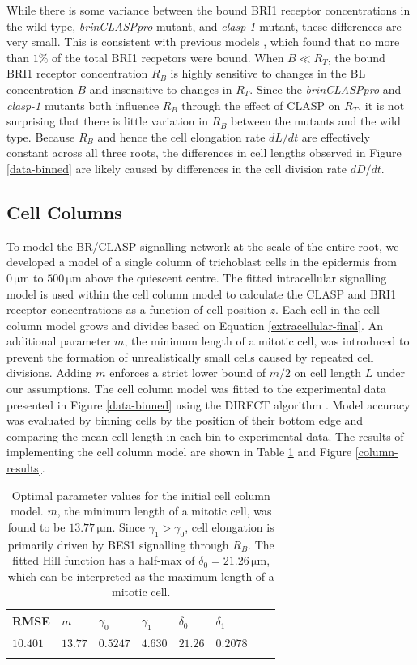\documentclass[referee,pdflatex,sn-mathphys-num]{sn-jnl}
\newcommand{\um}{\,\unit{\micro\metre}}
\begin{document}
While there is some variance between the bound BRI1 receptor concentrations in the wild type, \emph{brinCLASPpro} mutant, and \emph{clasp-1} mutant, these differences are very small.
This is consistent with previous models \cite{vanesse2012}, which found that no more than $1\%$ of the total BRI1 recpetors were bound.
When $B \ll R_{T}$, the bound BRI1 receptor concentration $R_{B}$ is highly sensitive to changes in the BL concentration $B$ and insensitive to changes in $R_{T}$.
Since the \emph{brinCLASPpro} and \emph{clasp-1} mutants both influence $R_{B}$ through the effect of CLASP on $R_{T}$, it is not surprising that there is little variation in $R_{B}$ between the mutants and the wild type.
Because $R_{B}$ and hence the cell elongation rate $dL/dt$ are effectively constant across all three roots, the differences in cell lengths observed in Figure \ref{data-binned} are likely caused by differences in the cell division rate $dD/dt$.

\subsection*{Cell Columns}

To model the BR/CLASP signalling network at the scale of the entire root, we developed a model of a single column of trichoblast cells in the epidermis from $0\um$ to $500\um$ above the quiescent centre.
The fitted intracellular signalling model is used within the cell column model to calculate the CLASP and BRI1 receptor concentrations as a function of cell position $z$.
Each cell in the cell column model grows and divides based on Equation \ref{extracellular-final}.
An additional parameter $m$, the minimum length of a mitotic cell, was introduced to prevent the formation of unrealistically small cells caused by repeated cell divisions.
Adding $m$ enforces a strict lower bound of $m/2$ on cell length $L$ under our assumptions.
The cell column model was fitted to the experimental data presented in Figure \ref{data-binned} using the DIRECT algorithm \cite{jones1993}.
Model accuracy was evaluated by binning cells by the position of their bottom edge and comparing the mean cell length in each bin to experimental data.
The results of implementing the cell column model are shown in Table \ref{column-fits} and Figure \ref{column-results}.

\begin{table}[ht]
\caption{
Optimal parameter values for the initial cell column model.
$m$, the minimum length of a mitotic cell, was found to be $13.77\um$. 
Since $\gamma_{1} > \gamma_{0}$, cell elongation is primarily driven by BES1 signalling through $R_{B}$.
The fitted Hill function has a half-max of $\delta_{0} = 21.26\um$, which can be interpreted as the maximum length of a mitotic cell.
}
\label{column-fits}
\begin{tabular}{@{}llllllll@{}}
\toprule
RMSE & $m$ & $\gamma_{0}$ & $\gamma_{1}$ & $\delta_{0}$ & $\delta_{1}$ \\
\midrule
$10.401$ & $13.77$ & $0.5247$ & $4.630$ & $21.26$ & $0.2078$ \\
\botrule
\end{tabular}
\end{table}
\end{document}
